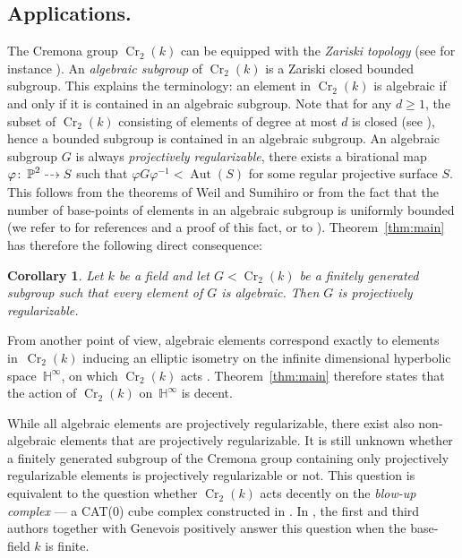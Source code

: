 \documentclass[JEP,XML,SOM,Unicode, NoEqCountersInSection,published]{cedram}
\newcommand{\dradpl}{{\hspace*{-2.5mm}\begin{tikzcd}[ampersand replacement=\&,column sep = scriptsize]\mbox{}\ar[r,dashed]\&\mbox{}\end{tikzcd}\hspace*{-2.5mm}}}
\newcommand{\dratst}{{\hspace*{-2.5mm}\begin{tikzcd}[ampersand replacement=\&,column sep = small]\mbox{}\ar[r,dashed]\&\mbox{}\end{tikzcd}\hspace*{-2mm}}}
\let\drascst\dratst
\newcommand{\dra}{\mathchoice{\dradpl}{\dratst}{\drascst}{\drascst}}
\let\dashrightarrow\dra
\newcommand{\p}{\operatorname{\mathbb{P}}}\let\P\p
\newcommand{\Aut}{\operatorname{Aut}}
\newcommand{\Cr}{\operatorname{Cr}}
\theoremstyle{plain}
\newtheorem{corollary}[theorem]{Corollary}
\theoremstyle{definition}
\begin{document}
\subsection{Applications.}
The Cremona group $\Cr_2(k)$ can be equipped with the \emph{Zariski topology} (see for instance \cite{Serre_Bourbaki}). An \emph{algebraic subgroup} of $\Cr_2(k)$ is a Zariski closed bounded subgroup. This explains the terminology: an element in $\Cr_2(k)$ is algebraic if and only if it is contained in an algebraic subgroup. Note that for any $d\geq1$, the subset of $\Cr_2(k)$ consisting of elements of degree at most $d$ is closed (see \cite{Blanc_Furter}), hence a bounded subgroup is contained in an algebraic subgroup. An algebraic subgroup $G$ is always \emph{projectively regularizable}, \ie there exists a birational map $\varphi\colon \p^2\dashrightarrow S$ such that $\varphi G\varphi^{-1}<\Aut(S)$ for some regular projective surface $S$. This follows from the theorems of Weil and Sumihiro or from the fact that the number of base-points of elements in an algebraic subgroup is uniformly bounded (we refer to \cite{Lamy_Cremona} for references and a proof of this fact, or to \cite{lonjou2021actions}). Theorem~\ref{thm:main} has therefore the following direct consequence:

\begin{corollary}
\label{cor:main}
{Let $k$ be a field and} let $G<\Cr_2(k)$ be a finitely generated subgroup such that every element of $G$ is algebraic. Then $G$ is projectively regularizable. \end{corollary}

From another point of view, algebraic elements correspond exactly to elements in~$\Cr_2(k)$ inducing an elliptic isometry on the infinite dimensional hyperbolic space~$\mathbb{H}^\infty$, on which $\Cr_2(k)$ acts \cite{Cantat_groupes_birat}. Theorem~\ref{thm:main} therefore states that the action of $\Cr_2(k)$ on~$\mathbb{H}^\infty$ is decent.

While all algebraic elements are projectively regularizable, there exist also non-algebraic elements that are projectively regularizable. It is still unknown whether a finitely generated subgroup of the Cremona group containing only projectively regularizable elements is projectively regularizable or not. This question is equivalent to the question whether $\Cr_2(k)$ acts decently on the \emph{blow-up complex} --- a CAT(0) cube complex constructed in \cite{lonjou2021actions}. In \cite{GLU_Neretin}, the first and third authors together with Genevois positively answer this question when the base-field {$k$} is finite.
\end{document}

